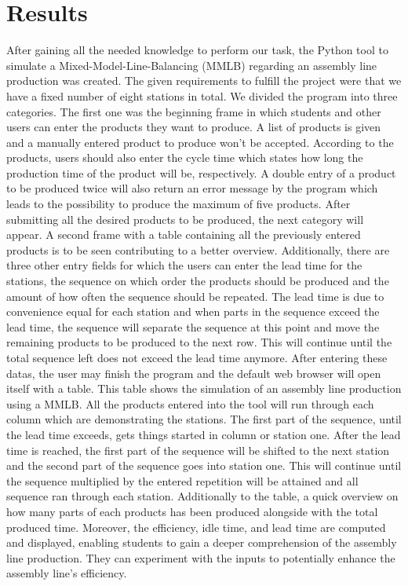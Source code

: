 \section{Results}
After gaining all the needed knowledge to perform our task, the Python tool to simulate a Mixed-Model-Line-Balancing (MMLB) regarding an assembly line production was created. The given requirements to fulfill the project were that we have a fixed number of eight stations in total. We divided the program into three categories. The first one was the beginning frame in which students and other users can enter the products they want to produce. A list of products is given and a manually entered product to produce won't be accepted. According to the products, users should also enter the cycle time which states how long the production time of the product will be, respectively. A double entry of a product to be produced twice will also return an error message by the program which leads to the possibility to produce the maximum of five products. After submitting all the desired products to be produced, the next category will appear. A second frame with a table containing all the previously entered products is to be seen contributing to a better overview. Additionally, there are three other entry fields for which the users can enter the lead time for the stations, the sequence on which order the products should be produced and the amount of how often the sequence should be repeated. The lead time is due to convenience equal for each station and when parts in the sequence exceed the lead time, the sequence will separate the sequence at this point and move the remaining products to be produced to the next row. This will continue until the total sequence left does not exceed the lead time anymore. After entering these datas, the user may finish the program and the default web browser will open itself with a table. This table shows the simulation of an assembly line production using a MMLB. All the products entered into the tool will run through each column which are demonstrating the stations. The first part of the sequence, until the lead time exceeds, gets things started in column or station one. After the lead time is reached, the first part of the sequence will be shifted to the next station and the second part of the sequence goes into station one. This will continue until the sequence multiplied by the entered repetition will be attained and all sequence ran through each station. Additionally to the table, a quick overview on how many parts of each products has been produced alongside with the total produced time. Moreover, the efficiency, idle time, and lead time are computed and displayed, enabling students to gain a deeper comprehension of the assembly line production. They can experiment with the inputs to potentially enhance the assembly line's efficiency.
\vspace{-0.3cm}
